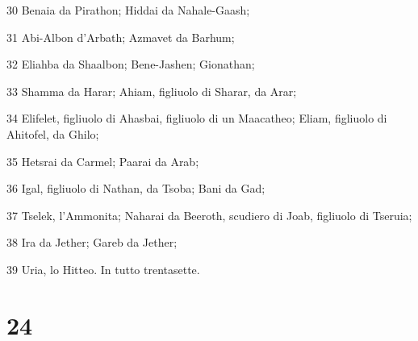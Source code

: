 \par 30 Benaia da Pirathon; Hiddai da Nahale-Gaash;
\par 31 Abi-Albon d'Arbath; Azmavet da Barhum;
\par 32 Eliahba da Shaalbon; Bene-Jashen; Gionathan;
\par 33 Shamma da Harar; Ahiam, figliuolo di Sharar, da Arar;
\par 34 Elifelet, figliuolo di Ahasbai, figliuolo di un Maacatheo; Eliam, figliuolo di Ahitofel, da Ghilo;
\par 35 Hetsrai da Carmel; Paarai da Arab;
\par 36 Igal, figliuolo di Nathan, da Tsoba; Bani da Gad;
\par 37 Tselek, l'Ammonita; Naharai da Beeroth, scudiero di Joab, figliuolo di Tseruia;
\par 38 Ira da Jether; Gareb da Jether;
\par 39 Uria, lo Hitteo. In tutto trentasette.

\chapter{24}

